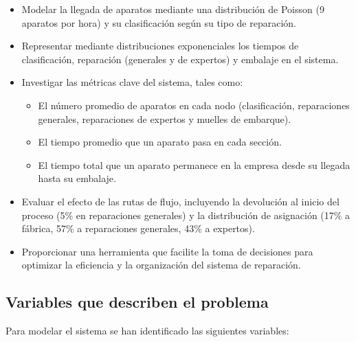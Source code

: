 \documentclass[a4paper,12pt]{article}
\begin{document}
\begin{itemize}
    \item Modelar la llegada de aparatos mediante una distribución de Poisson (9 aparatos por hora) y su clasificación según su tipo de reparación.
    \item Representar mediante distribuciones exponenciales los tiempos de clasificación, reparación (generales y de expertos) y embalaje en el sistema.
    \item Investigar las métricas clave del sistema, tales como:
    \begin{itemize}
        \item El número promedio de aparatos en cada nodo (clasificación, reparaciones generales, reparaciones de expertos y muelles de embarque).
        \item El tiempo promedio que un aparato pasa en cada sección.
        \item El tiempo total que un aparato permanece en la empresa desde su llegada hasta su embalaje.
    \end{itemize}
    \item Evaluar el efecto de las rutas de flujo, incluyendo la devolución al inicio del proceso (5\% en reparaciones generales) y la distribución de asignación (17\% a fábrica, 57\% a reparaciones generales, 43\% a expertos).
    \item Proporcionar una herramienta que facilite la toma de decisiones para optimizar la eficiencia y la organización del sistema de reparación.
\end{itemize}

\subsection{Variables que describen el problema}

Para modelar el sistema se han identificado las siguientes variables:
\end{document}

